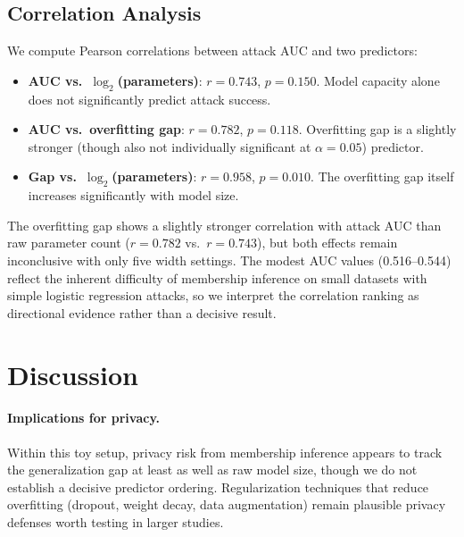 \documentclass[11pt,a4paper]{article}
\begin{document}
\subsection{Correlation Analysis}

We compute Pearson correlations between attack AUC and two predictors:

\begin{itemize}
  \item \textbf{AUC vs.\ $\log_2$(parameters)}: $r = 0.743$, $p = 0.150$.
    Model capacity alone does not significantly predict attack success.
  \item \textbf{AUC vs.\ overfitting gap}: $r = 0.782$, $p = 0.118$.
    Overfitting gap is a slightly stronger (though also not individually
    significant at $\alpha=0.05$) predictor.
  \item \textbf{Gap vs.\ $\log_2$(parameters)}: $r = 0.958$, $p = 0.010$.
    The overfitting gap itself increases significantly with model size.
\end{itemize}

The overfitting gap shows a slightly stronger correlation with attack AUC
than raw parameter count ($r = 0.782$ vs.\ $r = 0.743$), but both effects
remain inconclusive with only five width settings. The modest AUC values
(0.516--0.544) reflect the inherent difficulty of membership inference on
small datasets with simple logistic regression attacks, so we interpret the
correlation ranking as directional evidence rather than a decisive result.

\section{Discussion}

\paragraph{Implications for privacy.}
Within this toy setup, privacy risk from membership inference appears to
track the generalization gap at least as well as raw model size, though we
do not establish a decisive predictor ordering. Regularization techniques
that reduce overfitting (dropout, weight decay, data augmentation) remain
plausible privacy defenses worth testing in larger studies.
\end{document}
